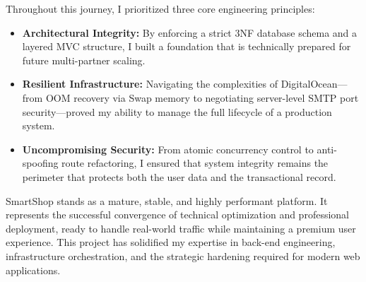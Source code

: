 \documentclass[12pt,a4paper]{article}
\begin{document}
Throughout this journey, I prioritized three core engineering principles:
\begin{itemize}
    \item \textbf{Architectural Integrity:} By enforcing a strict 3NF database schema and a layered MVC structure, I built a foundation that is technically prepared for future multi-partner scaling.
    \item \textbf{Resilient Infrastructure:} Navigating the complexities of DigitalOcean—from OOM recovery via Swap memory to negotiating server-level SMTP port security—proved my ability to manage the full lifecycle of a production system.
    \item \textbf{Uncompromising Security:} From atomic concurrency control to anti-spoofing route refactoring, I ensured that system integrity remains the perimeter that protects both the user data and the transactional record.
\end{itemize}

SmartShop stands as a mature, stable, and highly performant platform. It represents the successful convergence of technical optimization and professional deployment, ready to handle real-world traffic while maintaining a premium user experience. This project has solidified my expertise in back-end engineering, infrastructure orchestration, and the strategic hardening required for modern web applications.
\end{document}
